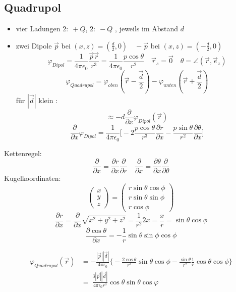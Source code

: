 \documentclass[titlepage,12pt,a4paper,ngerman]{report}
\begin{document}
\subsection{Quadrupol}
\begin{itemize}
\item vier Ladungen $ 2: \; +Q$, $ 2: \; -Q$ , jeweils im Abstand $d$
\item zwei Dipole $\vec{p}$ bei $(x,z) = (\frac{d}{2}, 0) \quad -\vec{p}$ bei $(x,z) = (-\frac{d}{2}, 0)$
$$ \varphi_{Dipol} = \frac{1}{4\pi\epsilon_0} \frac{\vec{p}\vec{r}}{r^3} = \frac{1}{4\pi\epsilon_0} \frac{p \cos \theta}{r^2} \quad \vec{r}_s = \vec{0} \quad \theta = \angle (\vec{r}, \vec{e}_z)$$
$$\varphi _{Quadrupol} = \varphi_{oben}(\vec{r}- \frac{\vec{d}}{2}) - \varphi_{unten}(\vec{r}+ \frac{\vec{d}}{2})$$
für $|\vec{d}|$ klein : $$\approx -d \frac{\partial}{\partial x } \varphi_{Dipol} (\vec{r})$$
$$\frac{\partial }{\partial x} \varphi_{Dipol} = \frac{1}{4\pi\epsilon_0} \bigg[ -2 \frac{p \cos \theta}{r^3} \frac{\partial r }{\partial x} - \frac{p \sin \theta }{r^2} \frac{\partial \theta}{\partial x} \bigg]$$
\end{itemize}

Kettenregel: 
$$ \frac{\partial}{\partial x} = \frac{\partial r}{\partial x} \frac{\partial}{\partial r} \quad \frac{\partial}{\partial x} = \frac{\partial \theta}{\partial x} \frac{\partial}{\partial \theta}$$
Kugelkoordinaten: $$ \begin{pmatrix}
x\\
y\\
z
\end{pmatrix} = \begin{pmatrix}
r \sin \theta \cos \phi \\
r \sin \theta \sin \phi \\
r \cos \phi
\end{pmatrix}$$
$$ \frac{\partial r}{\partial x} = \frac{\partial}{\partial x} \sqrt{x^2+y^2+z^2} = \frac{1}{r^2} 2x = \frac{x}{r} = \sin \theta \cos \phi $$
$$\frac{\partial \cos \theta}{\partial x} = -\frac{1}{r} \sin \theta \sin \phi \cos \phi$$

\begin{align*}
\varphi_{Quadrupol}(\vec{r}) &= -\frac{|\vec{p}||\vec{d}|}{4\pi\epsilon_0} \bigg\{ - \frac{2 \cos \theta }{r^3} \sin \theta \cos \phi - \frac{\sin \theta}{r^2} \frac{1}{r} \cos \theta \cos \phi \bigg\} \\
& = \  \frac{3|\vec{p}||\vec{d}|}{4\pi\epsilon_0 r^3} \cos \theta \sin \theta \cos \varphi
\end{align*}
\end{document}
